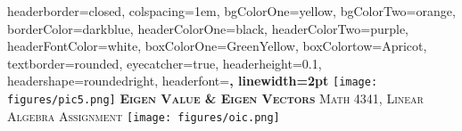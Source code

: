 \documentclass[landscape,a0paper,fontscale=0.350]{baposter} %
\begin{document}
\begin{poster}
{
headerborder=closed, %
colspacing=1em, %
bgColorOne=yellow, %
bgColorTwo=orange, %
borderColor=darkblue, %
headerColorOne=black, %
headerColorTwo=purple, %
headerFontColor=white, %
boxColorOne=GreenYellow, %
boxColortow=Apricot, %
textborder=rounded, %
eyecatcher=true, %
headerheight=0.1\textheight, %
headershape=roundedright, %
headerfont=\Large\bf\textsc, %
linewidth=2pt %
}
%
{\texttt{[image: figures/pic5.png]}} %
{\bf\textsc{Eigen Value \& Eigen Vectors}\vspace{0.5em}} %
{\textsc{Math 4341, Linear Algebra Assignment}} %
{\texttt{[image: figures/oic.png]}} %


\end{poster}
\end{document}
